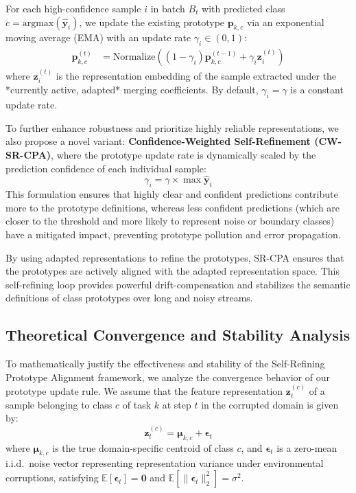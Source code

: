 \documentclass{article}
\theoremstyle{plain}
\theoremstyle{definition}
\theoremstyle{remark}
\begin{document}
For each high-confidence sample $i$ in batch $B_t$ with predicted class $c = \text{argmax}(\boldsymbol{\hat{y}}_i)$, we update the existing prototype $\boldsymbol{p}_{k,c}$ via an exponential moving average (EMA) with an update rate $\gamma_i \in (0, 1)$:
\begin{align}
    \boldsymbol{p}_{k,c}^{(t)} &= \text{Normalize}\left( (1 - \gamma_i) \boldsymbol{p}_{k,c}^{(t-1)} + \gamma_i \boldsymbol{z}_{i}^{(t)} \right)
\end{align}
where $\boldsymbol{z}_{i}^{(t)}$ is the representation embedding of the sample extracted under the *currently active, adapted* merging coefficients. By default, $\gamma_i = \gamma$ is a constant update rate. 

To further enhance robustness and prioritize highly reliable representations, we also propose a novel variant: \textbf{Confidence-Weighted Self-Refinement (CW-SR-CPA)}, where the prototype update rate is dynamically scaled by the prediction confidence of each individual sample:
\begin{equation}
    \gamma_i = \gamma \times \max \hat{\boldsymbol{y}}_i
\end{equation}
This formulation ensures that highly clear and confident predictions contribute more to the prototype definitions, whereas less confident predictions (which are closer to the threshold and more likely to represent noise or boundary classes) have a mitigated impact, preventing prototype pollution and error propagation.

By using adapted representations to refine the prototypes, SR-CPA ensures that the prototypes are actively aligned with the adapted representation space. This self-refining loop provides powerful drift-compensation and stabilizes the semantic definitions of class prototypes over long and noisy streams.

\subsection{Theoretical Convergence and Stability Analysis}
\label{subsec:theory}

To mathematically justify the effectiveness and stability of the Self-Refining Prototype Alignment framework, we analyze the convergence behavior of our prototype update rule. We assume that the feature representation $\boldsymbol{z}_t^{(c)}$ of a sample belonging to class $c$ of task $k$ at step $t$ in the corrupted domain is given by:
\begin{equation}
    \boldsymbol{z}_t^{(c)} = \boldsymbol{\mu}_{k,c} + \boldsymbol{\epsilon}_t
\end{equation}
where $\boldsymbol{\mu}_{k,c}$ is the true domain-specific centroid of class $c$, and $\boldsymbol{\epsilon}_t$ is a zero-mean i.i.d.\ noise vector representing representation variance under environmental corruptions, satisfying $\mathbb{E}[\boldsymbol{\epsilon}_t] = \boldsymbol{0}$ and $\mathbb{E}[\|\boldsymbol{\epsilon}_t\|_2^2] = \sigma^2$.
\end{document}

